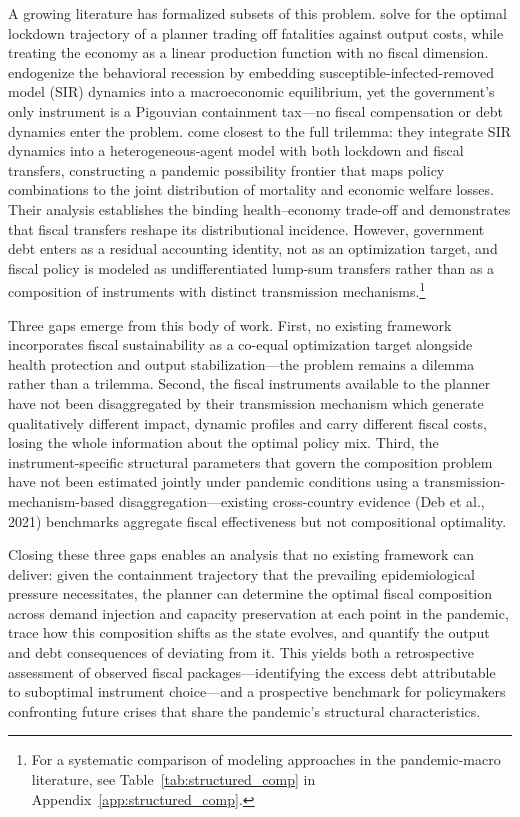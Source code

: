 \documentclass[12pt, a4paper]{article}
\begin{document}
A growing literature has formalized subsets of this problem. \citet{alvarez2020} solve for the optimal lockdown trajectory of a planner trading off fatalities against output costs, while treating the economy as a linear production function with no fiscal dimension. \citet{eichenbaum2021macro} endogenize the behavioral recession by embedding susceptible-infected-removed model (SIR) dynamics into a macroeconomic equilibrium, yet the government's only instrument is a Pigouvian containment tax---no fiscal compensation or debt dynamics enter the problem. \citet{KaplanMollViolante2020} come closest to the full trilemma: they integrate SIR dynamics into a heterogeneous-agent model with both lockdown and fiscal transfers, constructing a pandemic possibility frontier that maps policy combinations to the joint distribution of mortality and economic welfare losses. Their analysis establishes the binding health--economy trade-off and demonstrates that fiscal transfers reshape its distributional incidence. However, government debt enters as a residual accounting identity, not as an optimization target, and fiscal policy is modeled as undifferentiated lump-sum transfers rather than as a composition of instruments with distinct transmission mechanisms.\footnote{For a systematic comparison of modeling approaches in the pandemic-macro literature, see Table~\ref{tab:structured_comp} in Appendix~\ref{app:structured_comp}.}

Three gaps emerge from this body of work. First, no existing framework incorporates fiscal sustainability as a co-equal optimization target alongside health protection and output stabilization---the problem remains a dilemma rather than a trilemma. Second, the fiscal instruments available to the planner have not been disaggregated by their transmission mechanism which generate qualitatively different impact, dynamic profiles and carry different fiscal costs, losing the whole information about the optimal policy mix. Third, the instrument-specific structural parameters that govern the composition problem have not been estimated jointly under pandemic conditions using a transmission-mechanism-based disaggregation---existing cross-country evidence (Deb et al., 2021) benchmarks aggregate fiscal effectiveness but not compositional optimality. 

Closing these three gaps enables an analysis that no existing framework can deliver: given the containment trajectory that the prevailing epidemiological pressure necessitates, the planner can determine the optimal fiscal composition across demand injection and capacity preservation at each point in the pandemic, trace how this composition shifts as the state evolves, and quantify the output and debt consequences of deviating from it. This yields both a retrospective assessment of observed fiscal packages---identifying the excess debt attributable to suboptimal instrument choice---and a prospective benchmark for policymakers confronting future crises that share the pandemic's structural characteristics.
\end{document}
